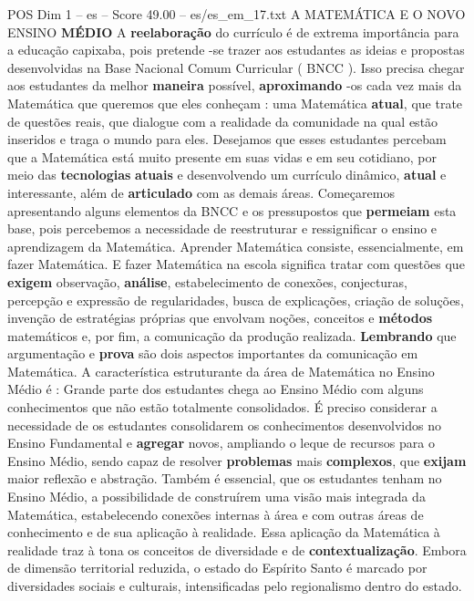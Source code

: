 \begin{textsample}{POS Dim 1 – es – Score 49.00 – es/es\_em\_17.txt}  \label{ex:f1_pos_195}
A MATEMÁTICA E O NOVO ENSINO \textbf{MÉDIO} A \textbf{reelaboração} do currículo é de extrema importância para a educação capixaba, pois pretende -se trazer aos estudantes as ideias e propostas desenvolvidas na Base Nacional Comum Curricular ( BNCC ).
Isso precisa chegar aos estudantes da melhor \textbf{maneira} possível, \textbf{aproximando} -os cada vez mais da Matemática que queremos que eles conheçam : uma Matemática \textbf{atual}, que trate de questões reais, que dialogue com a realidade da comunidade na qual estão inseridos e traga o mundo para eles.
Desejamos que esses estudantes percebam que a Matemática está muito presente em suas vidas e em seu cotidiano, por meio das \textbf{tecnologias} \textbf{atuais} e desenvolvendo um currículo dinâmico, \textbf{atual} e interessante, além de \textbf{articulado} com as demais áreas.
Começaremos apresentando alguns elementos da BNCC e os pressupostos que \textbf{permeiam} esta base, pois percebemos a necessidade de reestruturar e ressignificar o ensino e aprendizagem da Matemática.
Aprender Matemática consiste, essencialmente, em fazer Matemática.
E fazer Matemática na escola significa tratar com questões que \textbf{exigem} observação, \textbf{análise}, estabelecimento de conexões, conjecturas, percepção e expressão de regularidades, busca de explicações, criação de soluções, invenção de estratégias próprias que envolvam noções, conceitos e \textbf{métodos} matemáticos e, por fim, a comunicação da produção realizada. \textbf{Lembrando} que argumentação e \textbf{prova} são dois aspectos importantes da comunicação em Matemática.
A característica estruturante da área de Matemática no Ensino Médio é : Grande parte dos estudantes chega ao Ensino Médio com alguns conhecimentos que não estão totalmente consolidados.
É preciso considerar a necessidade de os estudantes consolidarem os conhecimentos desenvolvidos no Ensino Fundamental e \textbf{agregar} novos, ampliando o leque de recursos para o Ensino Médio, sendo capaz de resolver \textbf{problemas} mais \textbf{complexos}, que \textbf{exijam} maior reflexão e abstração.
Também é essencial, que os estudantes tenham no Ensino Médio, a possibilidade de construírem uma visão mais integrada da Matemática, estabelecendo conexões internas à área e com outras áreas de conhecimento e de sua aplicação à realidade.
Essa aplicação da Matemática à realidade traz à tona os conceitos de diversidade e de \textbf{contextualização}.
Embora de dimensão territorial reduzida, o estado do Espírito Santo é marcado por diversidades sociais e culturais, intensificadas pelo regionalismo dentro do estado.

\end{textsample}
